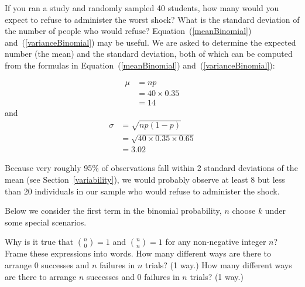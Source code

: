 \begin{example}{If you ran a study and randomly sampled 40 students, how many would you expect to refuse to administer the worst shock? What is the standard deviation of the number of people who would refuse? Equation~(\ref{meanBinomial}) and~(\ref{varianceBinomial}) may be useful.}
We are asked to determine the expected number (the mean) and the standard deviation, both of which can be  computed from the formulas in Equation~(\ref{meanBinomial}) and~(\ref{varianceBinomial}): 

\begin{align*}
\mu	& = np	\\
	& = 40\times 0.35 \\
	& = 14
\end{align*}
and 
\begin{align*}
\sigma	& = \sqrt{np(1-p)} \\
		& = \sqrt{40\times 0.35\times 0.65} \\
		& = 3.02
\end{align*} 

Because very roughly 95\% of observations fall within 2 standard deviations of the mean (see Section~\ref{variability}), we would probably observe at least 8 but less than 20 individuals in our sample who would refuse to administer the shock.
\end{example}



Below we consider the first term in the binomial probability, $n$ choose $k$ under some special scenarios.


\begin{example}{Why is it true that ${n \choose 0}=1$ and ${n \choose n}=1$ for any non-negative integer $n$?}Frame these expressions into words. How many different ways are there to arrange 0 successes and $n$ failures in $n$ trials? (1 way.) How many different ways are there to arrange $n$ successes and 0 failures in $n$ trials? (1 way.)
\end{example}



